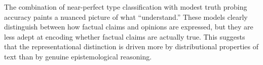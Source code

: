 The combination of near-perfect type classification with modest truth probing accuracy paints a nuanced picture of what \llms ``understand.'' These models clearly distinguish between how factual claims and opinions are expressed, but they are less adept at encoding whether factual claims are actually true. This suggests that the representational distinction is driven more by distributional properties of text than by genuine epistemological reasoning.
